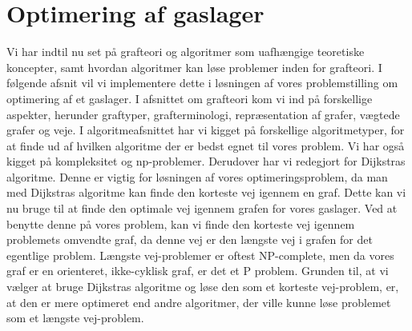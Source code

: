 \chapter{Optimering af gaslager}
Vi har indtil nu set på grafteori og algoritmer som  uafhængige teoretiske koncepter, samt hvordan algoritmer kan løse problemer inden for grafteori. I følgende afsnit vil vi implementere dette i løsningen af vores problemstilling om optimering af et gaslager. I afsnittet om grafteori kom vi ind på forskellige aspekter, herunder graftyper, grafterminologi, repræsentation af grafer, vægtede grafer og veje. I algoritmeafsnittet har vi kigget på forskellige algoritmetyper, for at finde ud af hvilken algoritme der er bedst egnet til vores problem. Vi har også kigget på kompleksitet og np-problemer. Derudover har vi redegjort for Dijkstras algoritme. Denne er vigtig for løsningen af vores optimeringsproblem, da man med Dijkstras algoritme kan finde den korteste vej igennem en graf. Dette kan vi nu bruge til at finde den optimale vej igennem grafen for vores gaslager. Ved at benytte denne på vores problem, kan vi finde den korteste vej igennem problemets omvendte graf, da denne vej er den længste vej i grafen for det egentlige problem. Længste vej-problemer er oftest NP-complete, men da vores graf er en orienteret, ikke-cyklisk graf, er det et P problem. Grunden til, at vi vælger at bruge Dijkstras algoritme og løse den som et korteste vej-problem, er, at den er mere optimeret end andre algoritmer, der ville kunne løse problemet som et længste vej-problem.



















